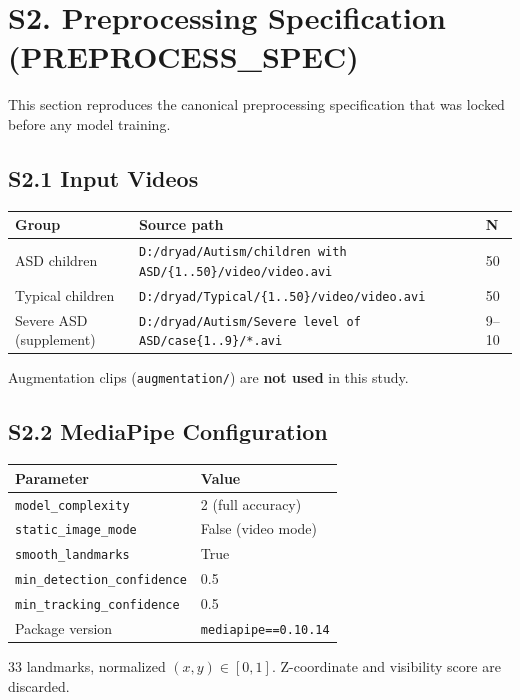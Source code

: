 \documentclass[12pt,a4paper]{article}
\begin{document}
\section{S2. Preprocessing Specification (PREPROCESS\_SPEC)}
\label{sec:s2}

This section reproduces the canonical preprocessing specification that was
locked before any model training.

\subsection{S2.1 Input Videos}

\begin{tabular}{@{}lll@{}}
\toprule
Group & Source path & N \\
\midrule
ASD children & \texttt{D:/dryad/Autism/children with ASD/\{1..50\}/video/video.avi} & 50 \\
Typical children & \texttt{D:/dryad/Typical/\{1..50\}/video/video.avi} & 50 \\
Severe ASD (supplement) & \texttt{D:/dryad/Autism/Severe level of ASD/case\{1..9\}/*.avi} & 9--10 \\
\bottomrule
\end{tabular}

\vspace{0.5em}
Augmentation clips (\texttt{augmentation/}) are \textbf{not used} in this study.

\subsection{S2.2 MediaPipe Configuration}

\begin{tabular}{@{}ll@{}}
\toprule
Parameter & Value \\
\midrule
\texttt{model\_complexity} & 2 (full accuracy) \\
\texttt{static\_image\_mode} & False (video mode) \\
\texttt{smooth\_landmarks} & True \\
\texttt{min\_detection\_confidence} & 0.5 \\
\texttt{min\_tracking\_confidence} & 0.5 \\
Package version & \texttt{mediapipe==0.10.14} \\
\bottomrule
\end{tabular}

\vspace{0.5em}
33 landmarks, normalized $(x,y) \in [0,1]$.
Z-coordinate and visibility score are discarded.
\end{document}
